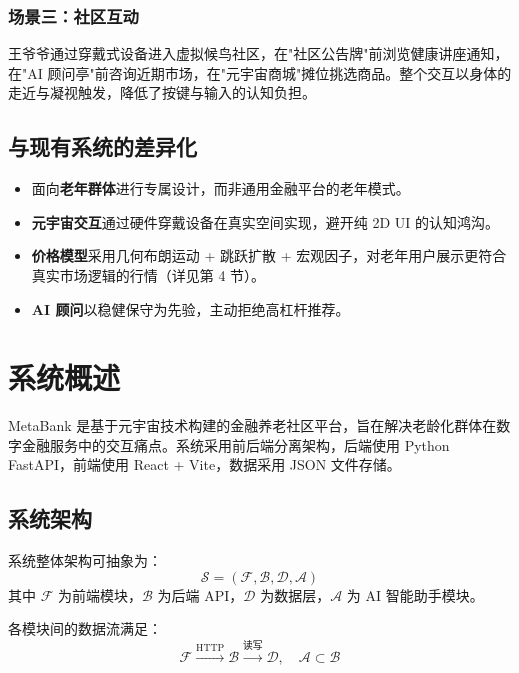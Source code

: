 \documentclass[12pt,a4paper]{article}
\begin{document}
\subsubsection{场景三：社区互动}

王爷爷通过穿戴式设备进入虚拟候鸟社区，在"社区公告牌"前浏览健康讲座通知，在"AI 顾问亭"前咨询近期市场，在"元宇宙商城"摊位挑选商品。整个交互以身体的走近与凝视触发，降低了按键与输入的认知负担。

\subsection{与现有系统的差异化}

\begin{itemize}
\item 面向\textbf{老年群体}进行专属设计，而非通用金融平台的老年模式。
\item \textbf{元宇宙交互}通过硬件穿戴设备在真实空间实现，避开纯 2D UI 的认知鸿沟。
\item \textbf{价格模型}采用几何布朗运动 + 跳跃扩散 + 宏观因子，对老年用户展示更符合真实市场逻辑的行情（详见第 4 节）。
\item \textbf{AI 顾问}以稳健保守为先验，主动拒绝高杠杆推荐。
\end{itemize}

\section{系统概述}

MetaBank 是基于元宇宙技术构建的金融养老社区平台，旨在解决老龄化群体在数字金融服务中的交互痛点。系统采用前后端分离架构，后端使用 Python FastAPI，前端使用 React + Vite，数据采用 JSON 文件存储。

\subsection{系统架构}

系统整体架构可抽象为：
\begin{equation}
\mathcal{S} = (\mathcal{F}, \mathcal{B}, \mathcal{D}, \mathcal{A})
\end{equation}
其中 $\mathcal{F}$ 为前端模块，$\mathcal{B}$ 为后端 API，$\mathcal{D}$ 为数据层，$\mathcal{A}$ 为 AI 智能助手模块。

各模块间的数据流满足：
\begin{equation}
\mathcal{F} \xrightarrow{\text{HTTP}} \mathcal{B} \xrightarrow{\text{读写}} \mathcal{D}, \quad \mathcal{A} \subset \mathcal{B}
\end{equation}
\end{document}
